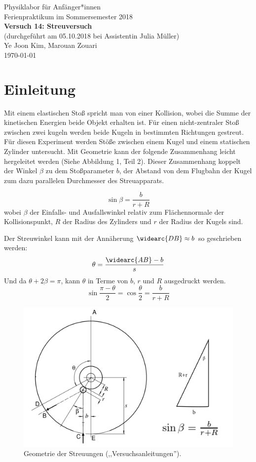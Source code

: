 \documentclass[11pt,a4paper]{article}
\begin{document}
	

{
	\centering 
	\large 
	Physiklabor für Anfänger*innen \\
	Ferienpraktikum im Sommersemester 2018 \\[4mm]
	\textbf{\LARGE 
		Versuch 14: Streuversuch
	} \\[3mm]
	(durchgeführt am 05.10.2018 bei Assistentin Julia Müller) \\
	Ye Joon Kim, Marouan Zouari\\
	\today \\[10mm]
}

\tableofcontents
\newpage
\section{Einleitung}
Mit einem elastischen Stoß spricht man von einer Kollision, wobei die Summe der kinetischen Energien beide Objekt erhalten ist. Für einen nicht-zentraler Stoß zwischen zwei kugeln werden beide Kugeln in bestimmten Richtungen gestreut. Für diesen Experiment werden Stöße zwischen einem Kugel und einem statischen Zylinder untersucht. Mit Geometrie kann  der folgende Zusammenhang leicht hergeleitet werden (Siehe Abbildung 1, Teil 2). Dieser Zusammenhang koppelt der Winkel $\beta$ zu dem Stoßparameter $b$, der Abstand von dem Flugbahn der Kugel zum dazu parallelen Durchmesser des Streuapparats. 

$$\sin\beta = \frac{b}{r+R}$$
wobei $\beta$ der Einfalls- und Ausfallswinkel relativ zum Flächennormale der Kollisionspunkt, $R$ der Radius des Zylinders und $r$ der Radius der Kugels sind. 

Der Streuwinkel kann mit der Annäherung $\widearc{DB}\approx b$ so geschrieben werden:
$$\theta = \frac{\widearc{AB}-b}{s}$$
Und da $\theta + 2\beta = \pi$, kann $\theta$ in Terme von $b$, $r$ und $R$ ausgedruckt werden. 
$$\sin{\frac{\pi-\theta}{2}}=\cos{\frac{\theta}{2}}=\frac{b}{r+R}$$

\begin{figure}
	\centering
	\includegraphics[width=\linewidth]{Abb1}
	\caption{Geometrie der Streuungen (,,Versuchsanleitungen'').}
\end{figure}
\end{document}
